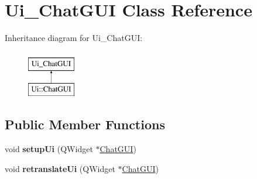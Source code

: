 \hypertarget{classUi__ChatGUI}{}\section{Ui\+\_\+\+Chat\+G\+UI Class Reference}
\label{classUi__ChatGUI}
Inheritance diagram for Ui\+\_\+\+Chat\+G\+UI\+:\begin{figure}[H]
\begin{center}
\leavevmode
\includegraphics[height=2.000000cm]{classUi__ChatGUI}
\end{center}
\end{figure}
\subsection*{Public Member Functions}
\begin{DoxyCompactItemize}
\item 
void {\bfseries setup\+Ui} (Q\+Widget $\ast$\hyperlink{classChatGUI}{Chat\+G\+UI})\hypertarget{classUi__ChatGUI_ad3294952b41d0426cf6d34a38752391c}{}\label{classUi__ChatGUI_ad3294952b41d0426cf6d34a38752391c}

\item 
void {\bfseries retranslate\+Ui} (Q\+Widget $\ast$\hyperlink{classChatGUI}{Chat\+G\+UI})\hypertarget{classUi__ChatGUI_a656fabe51b5b1147bc5534c698774faf}{}\label{classUi__ChatGUI_a656fabe51b5b1147bc5534c698774faf}

\end{DoxyCompactItemize}
